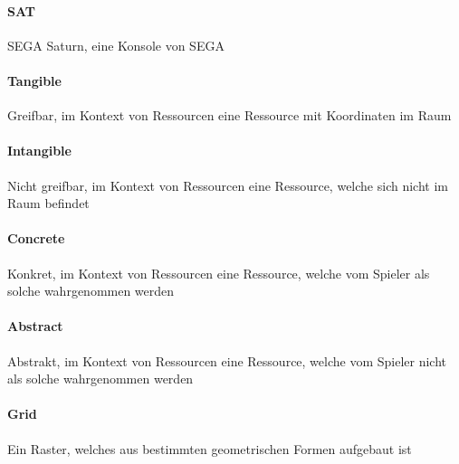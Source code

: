 \paragraph*{SAT} SEGA Saturn, eine Konsole von SEGA
\paragraph*{Tangible} Greifbar, im Kontext von Ressourcen eine Ressource mit Koordinaten im Raum
\paragraph*{Intangible} Nicht greifbar, im Kontext von Ressourcen eine Ressource, welche sich nicht im Raum befindet
\paragraph*{Concrete} Konkret, im Kontext von Ressourcen eine Ressource, welche vom Spieler als solche wahrgenommen werden
\paragraph*{Abstract} Abstrakt, im Kontext von Ressourcen eine Ressource, welche vom Spieler nicht als solche wahrgenommen werden

\paragraph*{Grid} Ein Raster, welches aus bestimmten geometrischen Formen aufgebaut ist
